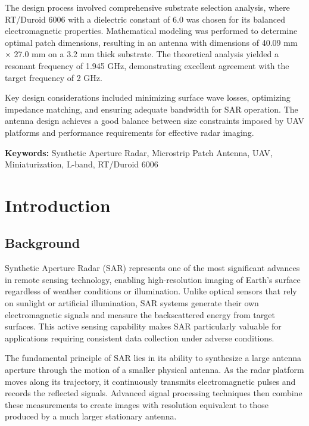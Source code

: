 \documentclass[12pt]{article}
\begin{document}
The design process involved comprehensive substrate selection analysis, where RT/Duroid 6006 with a dielectric constant of 6.0 was chosen for its balanced electromagnetic properties. Mathematical modeling was performed to determine optimal patch dimensions, resulting in an antenna with dimensions of 40.09 mm $\times$ 27.0 mm on a 3.2 mm thick substrate. The theoretical analysis yielded a resonant frequency of 1.945 GHz, demonstrating excellent agreement with the target frequency of 2 GHz.

Key design considerations included minimizing surface wave losses, optimizing impedance matching, and ensuring adequate bandwidth for SAR operation. The antenna design achieves a good balance between size constraints imposed by UAV platforms and performance requirements for effective radar imaging.

\textbf{Keywords:} Synthetic Aperture Radar, Microstrip Patch Antenna, UAV, Miniaturization, L-band, RT/Duroid 6006

\newpage
\tableofcontents
\newpage

\listoffigures
\newpage

\listoftables
\newpage

\section{Introduction}

\subsection{Background}

Synthetic Aperture Radar (SAR) represents one of the most significant advances in remote sensing technology, enabling high-resolution imaging of Earth's surface regardless of weather conditions or illumination. Unlike optical sensors that rely on sunlight or artificial illumination, SAR systems generate their own electromagnetic signals and measure the backscattered energy from target surfaces. This active sensing capability makes SAR particularly valuable for applications requiring consistent data collection under adverse conditions.

The fundamental principle of SAR lies in its ability to synthesize a large antenna aperture through the motion of a smaller physical antenna. As the radar platform moves along its trajectory, it continuously transmits electromagnetic pulses and records the reflected signals. Advanced signal processing techniques then combine these measurements to create images with resolution equivalent to those produced by a much larger stationary antenna.
\end{document}
